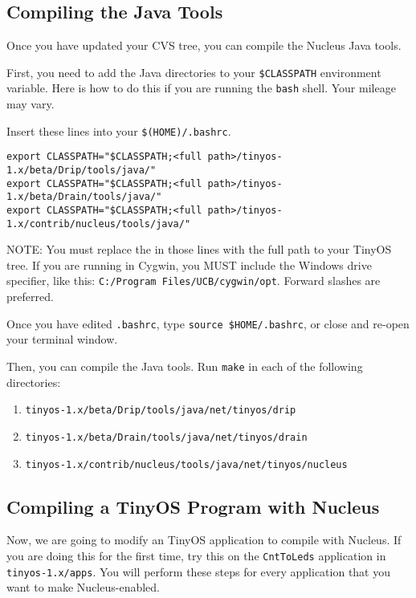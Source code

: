 \documentclass{article}
\begin{document}
\subsection{Compiling the Java Tools}

Once you have updated your CVS tree, you can compile the Nucleus Java
tools.

First, you need to add the Java directories to your {\tt \$CLASSPATH}
environment variable. Here is how to do this if you are running the
{\tt bash} shell. Your mileage may vary.

Insert these lines into your {\tt \$(HOME)/.bashrc}. 

\begin{verbatim}
export CLASSPATH="$CLASSPATH;<full path>/tinyos-1.x/beta/Drip/tools/java/"
export CLASSPATH="$CLASSPATH;<full path>/tinyos-1.x/beta/Drain/tools/java/"
export CLASSPATH="$CLASSPATH;<full path>/tinyos-1.x/contrib/nucleus/tools/java/"
\end{verbatim}

NOTE: You must replace the {\tt <full path>} in those lines with the
full path to your TinyOS tree. If you are running in Cygwin, you MUST
include the Windows drive specifier, like this: {\tt C:/Program
Files/UCB/cygwin/opt}. Forward slashes are preferred.

Once you have edited {\tt .bashrc}, type {\tt source \$HOME/.bashrc},
or close and re-open your terminal window.

Then, you can compile the Java tools. Run {\tt make} in each of the following
directories:

\begin{enumerate}
\item {\tt tinyos-1.x/beta/Drip/tools/java/net/tinyos/drip}
\item {\tt tinyos-1.x/beta/Drain/tools/java/net/tinyos/drain}
\item {\tt tinyos-1.x/contrib/nucleus/tools/java/net/tinyos/nucleus}
\end{enumerate}

\subsection{Compiling a TinyOS Program with Nucleus}

Now, we are going to modify an TinyOS application to compile with
Nucleus. If you are doing this for the first time, try this on the
{\tt CntToLeds} application in {\tt tinyos-1.x/apps}. You will perform
these steps for every application that you want to make
Nucleus-enabled.
\end{document}
